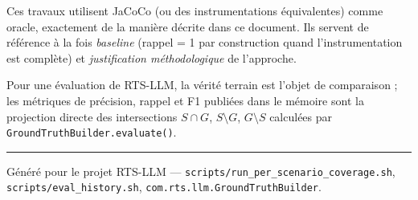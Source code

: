 \documentclass[11pt,a4paper]{article}
\begin{document}
Ces travaux utilisent JaCoCo (ou des instrumentations équivalentes) comme oracle, exactement de la manière décrite dans ce document. Ils servent de référence à la fois \emph{baseline} (rappel = 1 par construction quand l'instrumentation est complète) et \emph{justification méthodologique} de l'approche.

Pour une évaluation de RTS-LLM, la vérité terrain est l'objet de comparaison ; les métriques de précision, rappel et F1 publiées dans le mémoire sont la projection directe des intersections $S \cap G$, $S \setminus G$, $G \setminus S$ calculées par \texttt{GroundTruthBuilder.evaluate()}.

\vspace{2em}
\hrule
\vspace{0.5em}
\begin{center}
\textcolor{muted}{\small Généré pour le projet RTS-LLM --- \texttt{scripts/run\_per\_scenario\_coverage.sh}, \texttt{scripts/eval\_history.sh}, \texttt{com.rts.llm.GroundTruthBuilder}.}
\end{center}
\end{document}
